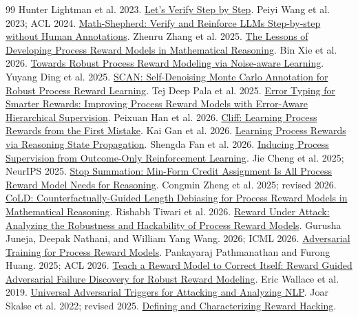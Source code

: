 \begin{thebibliography}{99}
\small
{} Hunter Lightman et al. 2023. \href{https://arxiv.org/abs/2305.20050}{Let's Verify Step by Step}.
 Peiyi Wang et al. 2023; ACL 2024. \href{https://arxiv.org/abs/2312.08935}{Math-Shepherd: Verify and Reinforce LLMs Step-by-step without Human Annotations}.
 Zhenru Zhang et al. 2025. \href{https://arxiv.org/abs/2501.07301}{The Lessons of Developing Process Reward Models in Mathematical Reasoning}.
 Bin Xie et al. 2026. \href{https://arxiv.org/abs/2601.12748}{Towards Robust Process Reward Modeling via Noise-aware Learning}.
 Yuyang Ding et al. 2025. \href{https://arxiv.org/abs/2509.16548}{SCAN: Self-Denoising Monte Carlo Annotation for Robust Process Reward Learning}.
 Tej Deep Pala et al. 2025. \href{https://arxiv.org/abs/2505.19706}{Error Typing for Smarter Rewards: Improving Process Reward Models with Error-Aware Hierarchical Supervision}.
 Peixuan Han et al. 2026. \href{https://arxiv.org/abs/2609.02817}{Cliff: Learning Process Rewards from the First Mistake}.
 Kai Gan et al. 2026. \href{https://arxiv.org/abs/2609.39220}{Learning Process Rewards via Reasoning State Propagation}.
 Shengda Fan et al. 2026. \href{https://arxiv.org/abs/2609.36641}{Inducing Process Supervision from Outcome-Only Reinforcement Learning}.
 Jie Cheng et al. 2025; NeurIPS 2025. \href{https://arxiv.org/abs/2504.15275}{Stop Summation: Min-Form Credit Assignment Is All Process Reward Model Needs for Reasoning}.
 Congmin Zheng et al. 2025; revised 2026. \href{https://arxiv.org/abs/2507.15698}{CoLD: Counterfactually-Guided Length Debiasing for Process Reward Models in Mathematical Reasoning}.
 Rishabh Tiwari et al. 2026. \href{https://arxiv.org/abs/2603.06621}{Reward Under Attack: Analyzing the Robustness and Hackability of Process Reward Models}.
 Gurusha Juneja, Deepak Nathani, and William Yang Wang. 2026; ICML 2026. \href{https://proceedings.mlr.press/v306/juneja26a.html}{Adversarial Training for Process Reward Models}.
 Pankayaraj Pathmanathan and Furong Huang. 2025; ACL 2026. \href{https://arxiv.org/abs/2507.06419}{Teach a Reward Model to Correct Itself: Reward Guided Adversarial Failure Discovery for Robust Reward Modeling}.
 Eric Wallace et al. 2019. \href{https://arxiv.org/abs/1908.07125}{Universal Adversarial Triggers for Attacking and Analyzing NLP}.
 Joar Skalse et al. 2022; revised 2025. \href{https://arxiv.org/abs/2209.13085}{Defining and Characterizing Reward Hacking}.

\end{thebibliography}
